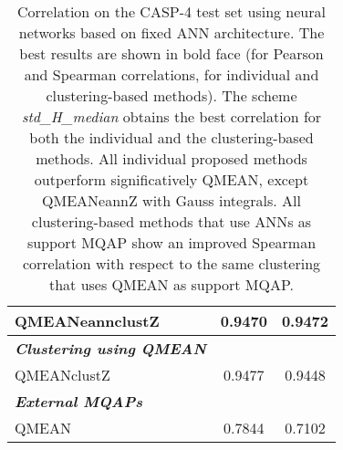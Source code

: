 \begin{table}[htbp]
\begin{tabular}{lcc}
	QMEANeannclustZ	&0.9470	&0.9472\\
	\midrule                %
	\emph{\textbf{Clustering using QMEAN}} & &\\
	QMEANclustZ	&0.9477	&0.9448\\	
	\midrule                %
	\emph{\textbf{External MQAPs}} & &\\	
	QMEAN	&0.7844	&0.7102\\
\bottomrule                %
\end{tabular}
\caption[Performance on the CASP-4 test set using neural networks based on fixed ANN architecture]{Correlation on the CASP-4 test set using neural networks based on fixed ANN architecture. The best results are shown in bold face (for Pearson and Spearman correlations, for individual and clustering-based methods). The scheme \emph{std\_H\_median} obtains the best correlation for both the individual and the clustering-based methods. All individual proposed methods outperform significatively QMEAN, except QMEANeannZ with Gauss integrals. All clustering-based methods that use ANNs as support MQAP show an improved Spearman correlation with respect to the same clustering that uses QMEAN as support MQAP.}
\label{tab:casp4}
\end{table}



